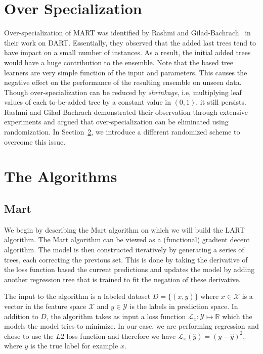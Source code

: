 \documentclass{article} %
\begin{document}
\section{Over Specialization} \label{sec:over-spe}

Over-specialization of MART was identified  by Rashmi and Gilad-Bachrach~\cite{dart} in their work on DART. Essentially, they observed that the added last trees tend to have impact on a small number of instances. As a result, the initial added trees would have a huge contribution to the ensemble. Note that the based tree learners are very simple function of the input and parameters. This causes the negative effect on the performance of the resulting ensemble on unseen data. Though over-specialization can be reduced by \emph{shrinkage}, i.e, multiplying leaf values of each to-be-added tree by a constant value in $(0,1)$, it still persists.  Rashmi and Gilad-Bachrach demonstrated their observation through extensive experiments and argued that over-specialization can be eliminated using randomization.     In Section~\ref{sec:algo}, we introduce a different randomized scheme to overcome this issue.

\section{The Algorithms} \label{sec:algo}

\subsection{Mart}
We begin by describing the Mart\cite{mart} algorithm on which we will build the LART algorithm. The Mart algorithm can be viewed as a (functional) gradient decent algorithm. The model is then constructed iteratively by generating a series of trees, each correcting the previous set. This is done by taking the derivative of the loss function based the current predictions and updates the model by adding another regression tree that is trained to fit the negation of these derivative. 

The input to the algorithm is a labeled dataset $D=\{(x,y)\}$ where $x\in \mathcal{X}$ is a vector in the feature space $\mathcal{X}$ and $y\in \mathcal{Y}$ is the labels in prediction space. In addition to $D$, the algorithm takes as input a loss function $\mathcal{L}_x :  \mathcal{Y} \mapsto \mathds{R} $ which the models the model tries to minimize. In our case, we are performing regression and chose to use the $L2$ loss function and therefore we have $\mathcal{L}_x(\hat{y} ) = (y- \hat{y})^2$, where $y$ is the true label for example $x$.
 
\end{document}
